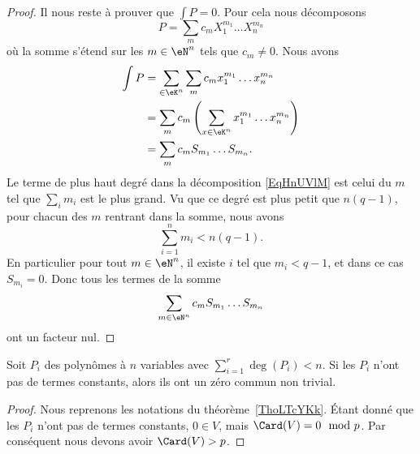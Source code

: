 \begin{proof}
	Il nous reste à prouver que \( \int P=0\). Pour cela nous décomposons
	\begin{equation}        \label{EqHnUVlM}
		P=\sum_m c_mX_1^{m_1}\ldots X_n^{m_n}
	\end{equation}
	où la somme s'étend sur les \( m\in \eN^n\) tels que \( c_m\neq 0\). Nous avons
	\begin{subequations}
		\begin{align}
			\int P & =\sum_{\in \eK^n}\sum_mc_m x_1^{m_1}\ldots x_n^{m_n}                  \\
			       & =\sum_{m}c_m\left( \sum_{x\in \eK^n}x_1^{m_1}\ldots x_n^{m_n} \right) \\
			       & =\sum_m c_m S_{m_1}\ldots S_{m_n}.
		\end{align}
	\end{subequations}
	Le terme de plus haut degré dans la décomposition \eqref{EqHnUVlM} est celui du \( m\) tel que \( \sum_im_i\) est le plus grand. Vu que ce degré est plus petit que \( n(q-1)\), pour chacun des \( m\) rentrant dans la somme, nous avons
	\begin{equation}
		\sum_{i=1}^nm_i<n(q-1).
	\end{equation}
	En particulier pour tout \( m\in \eN^n\), il existe \( i\) tel que \( m_i<q-1\), et dans ce cas \( S_{m_i}=0\). Donc tous les termes de la somme
	\begin{equation}
		\sum_{m\in \eN^n}c_mS_{m_1}\ldots S_{m_n}
	\end{equation}
	ont un facteur nul.
\end{proof}

\begin{corollary}       \label{CorfuHNKz}
	Soit \( P_i\) des polynômes à \( n\) variables avec \( \sum_{i=1}^r\deg(P_i)<n\). Si les \( P_i\) n'ont pas de termes constants, alors ils ont un zéro commun non trivial.
\end{corollary}

\begin{proof}
	Nous reprenons les notations du théorème~\ref{ThoLTcYKk}. Étant donné que les \( P_i\) n'ont pas de termes constants, \( 0\in V\), mais \( \Card(V)=0\mod p\). Par conséquent nous devons avoir \( \Card(V)>p\).
\end{proof}

